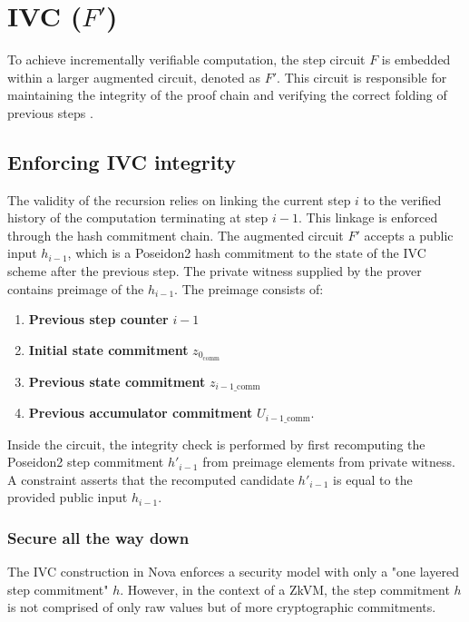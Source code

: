 \section{IVC ($F'$)}\label{sec:ivc}

To achieve incrementally verifiable computation, the step circuit $F$ is
embedded within a larger augmented circuit, denoted as $F'$. This circuit is
responsible for maintaining the integrity of the proof chain and verifying the
correct folding of previous steps \cite{Nova, SuperNova}.

\subsection{Enforcing IVC integrity}

The validity of the recursion relies on linking the current step $i$ to the
verified history of the computation terminating at step $i-1$. This
linkage is enforced through the hash commitment chain. The augmented circuit
$F'$ accepts a public input $h_{i-1}$, which is a Poseidon2 \cite{Poseidon2}
hash commitment to the state of the IVC scheme after the previous step.
The private witness supplied by the prover contains preimage of the $h_{i-1}$.
The preimage consists of:

\begin{enumerate}
	\item \textbf{Previous step counter} $i-1$
	\item \textbf{Initial state commitment} $z_{0_\text{comm}}$
	\item \textbf{Previous state commitment} $z_{i-1\_\text{comm}}$
	\item \textbf{Previous accumulator commitment} $U_{i-1\_\text{comm}}$.
\end{enumerate}

Inside the circuit, the integrity check is performed by first recomputing
the Poseidon2 step commitment $h'_{i-1}$ from preimage elements from private
witness. A constraint asserts that the recomputed candidate $h'_{i-1}$ is
equal to the provided public input $h_{i-1}$.

\subsubsection*{Secure all the way down}

The IVC construction in Nova \cite{Nova} enforces a security model with
only a "one layered step commitment" $h$. However, in the context of a ZkVM, the
step commitment $h$ is not comprised of only raw values but of more cryptographic
commitments.

